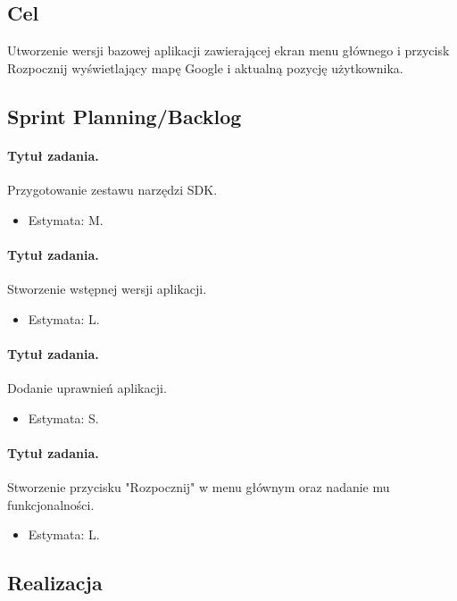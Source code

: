 \documentclass[a4paper]{article}
\begin{document}
\subsection{Cel} Utworzenie wersji bazowej aplikacji zawierającej ekran menu głównego i przycisk Rozpocznij wyświetlający mapę Google i aktualną pozycję użytkownika.
\subsection{Sprint Planning/Backlog}

\paragraph{Tytuł zadania.} Przygotowanie zestawu narzędzi SDK.
\begin{itemize}
\item Estymata: M.
\end{itemize}

\paragraph{Tytuł zadania.} Stworzenie wstępnej wersji aplikacji.
\begin{itemize}
\item Estymata: L.
\end{itemize}

\paragraph{Tytuł zadania.} Dodanie uprawnień aplikacji.
\begin{itemize}
\item Estymata: S.
\end{itemize}

\paragraph{Tytuł zadania.} Stworzenie przycisku "Rozpocznij" w menu głównym oraz nadanie mu funkcjonalności.
\begin{itemize}
\item Estymata: L.
\end{itemize}

\subsection{Realizacja} %
\end{document}
